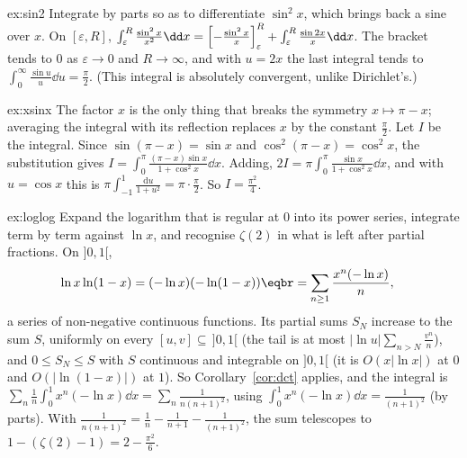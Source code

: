 \begin{solution}{ex:sin2}
\idea Integrate by parts so as to differentiate $\sin^2x$, which brings back a sine over $x$.
\writeup On $[\varepsilon,R]$, $\int_\varepsilon^R\frac{\sin^2x}{x^2}\dd x=\Bigl[-\frac{\sin^2x}x\Bigr]_\varepsilon^R+\int_\varepsilon^R\frac{\sin2x}x\dd x$. The bracket tends to
$0$ as $\varepsilon\to0$ and $R\to\infty$, and with $u=2x$ the last integral tends to $\int_0^\infty\frac{\sin u}u\dd u=\frac\pi2$. (This integral is
absolutely convergent, unlike Dirichlet's.)
\end{solution}

\begin{solution}{ex:xsinx}
\idea The factor $x$ is the only thing that breaks the symmetry $x\mapsto\pi-x$; averaging the integral with its reflection
replaces $x$ by the constant $\frac\pi2$.
\writeup Let $I$ be the integral. Since $\sin(\pi-x)=\sin x$ and $\cos^2(\pi-x)=\cos^2x$, the substitution gives
$I=\int_0^\pi\frac{(\pi-x)\sin x}{1+\cos^2x}\dd x$. Adding, $2I=\pi\int_0^\pi\frac{\sin x}{1+\cos^2x}\dd x$, and with $u=\cos x$ this is
$\pi\int_{-1}^1\frac{\mathrm du}{1+u^2}=\pi\cdot\frac\pi2$. So $I=\frac{\pi^2}4$.
\end{solution}

\begin{solution}{ex:loglog}
\idea Expand the logarithm that is regular at $0$ into its power series, integrate term by term against $\ln x$, and recognise
$\zeta(2)$ in what is left after partial fractions.
\writeup On $]0,1[$,
\[
\begin{aligned}\ln x\ln(1-x)&=(-\ln x)(-\ln(1-x))\eqbr=\sum_{n\ge1}\frac{x^n(-\ln x)}n,\end{aligned}
\]
a series of non-negative continuous functions. Its partial sums $S_N$ increase to the sum $S$, uniformly on every $[u,v]\subseteq\,]0,1[$ (the tail is at most
$|\ln u|\sum_{n>N}\frac{v^n}n$), and $0\le S_N\le S$ with $S$ continuous and integrable on $]0,1[$ (it is $O(x|\ln x|)$ at $0$ and $O(|\ln(1-x)|)$
at $1$). So Corollary~\ref{cor:dct} applies, and the integral is $\sum_n\frac1n\int_0^1x^n(-\ln x)\dd x=\sum_n\frac1{n(n+1)^2}$, using $\int_0^1x^n(-\ln x)\dd x=\frac1{(n+1)^2}$ (by parts).
With $\frac1{n(n+1)^2}=\frac1n-\frac1{n+1}-\frac1{(n+1)^2}$, the sum telescopes to $1-(\zeta(2)-1)=2-\frac{\pi^2}6$.
\end{solution}

